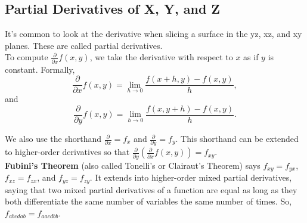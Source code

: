 \subsection{Partial Derivatives of X, Y, and Z}
\noindent
It's common to look at the derivative when slicing a surface in the yz, xz, and xy planes. These are called partial derivatives.\\

\noindent
To compute $\frac{\partial}{\partial x}{f(x,y)}$, we take the derivative with respect to $x$ as if $y$ is constant. Formally,
\begin{equation*}
	\frac{\partial}{\partial x}f(x,y) = \lim_{h \to 0}{\frac{f(x+h,y)-f(x,y)}{h}},
\end{equation*} 
and 
\begin{equation*}
	\frac{\partial}{\partial y}f(x,y) = \lim_{h \to 0}{\frac{f(x,y+h)-f(x,y)}{h}}.
\end{equation*}

\noindent
We also use the shorthand $\frac{\partial}{\partial x}=f_x$ and $\frac{\partial}{\partial y}=f_y$. This shorthand can be extended to higher-order derivatives so that $\frac{\partial}{\partial y}\left(\frac{\partial}{\partial x}f(x,y)\right)=f_{xy}$.\\

\noindent
\textbf{Fubini's Theorem} (also called Tonelli's or Clairaut's Theorem) says $f_{xy} = f_{yx}$, $f_{xz} = f_{zx}$, and $f_{yz} = f_{zy}$. It extends into higher-order mixed partial derivatives, saying that two mixed partial derivatives of a function are equal as long as they both differentiate the same number of variables the same number of times. So, $f_{abcdab} = f_{aacdbb}$.